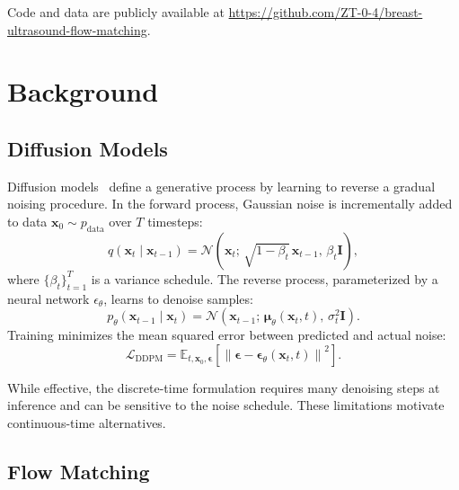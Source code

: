 \documentclass[twocolumn]{article}
\begin{document}
\noindent Code and data are publicly available at \url{https://github.com/ZT-0-4/breast-ultrasound-flow-matching}.

\section{Background}
\label{sec:background}

\subsection{Diffusion Models}

Diffusion models~\cite{ho2020,sohl2015} define a generative process by learning to reverse a gradual noising procedure. In the forward process, Gaussian noise is incrementally added to data $\mathbf{x}_0 \sim p_{\text{data}}$ over $T$ timesteps:
\begin{equation}
    q(\mathbf{x}_t \mid \mathbf{x}_{t-1}) = \mathcal{N}\!\left(\mathbf{x}_t;\, \sqrt{1 - \beta_t}\, \mathbf{x}_{t-1},\, \beta_t \mathbf{I}\right),
\end{equation}
where $\{\beta_t\}_{t=1}^{T}$ is a variance schedule. The reverse process, parameterized by a neural network $\epsilon_\theta$, learns to denoise samples:
\begin{equation}
    p_\theta(\mathbf{x}_{t-1} \mid \mathbf{x}_t) = \mathcal{N}\!\left(\mathbf{x}_{t-1};\, \boldsymbol{\mu}_\theta(\mathbf{x}_t, t),\, \sigma_t^2 \mathbf{I}\right).
\end{equation}
Training minimizes the mean squared error between predicted and actual noise:
\begin{equation}
    \mathcal{L}_{\text{DDPM}} = \mathbb{E}_{t, \mathbf{x}_0, \boldsymbol{\epsilon}}\!\left[\left\|\boldsymbol{\epsilon} - \boldsymbol{\epsilon}_\theta(\mathbf{x}_t, t)\right\|^2\right].
\end{equation}

While effective, the discrete-time formulation requires many denoising steps at inference and can be sensitive to the noise schedule. These limitations motivate continuous-time alternatives.

\subsection{Flow Matching}
\end{document}

